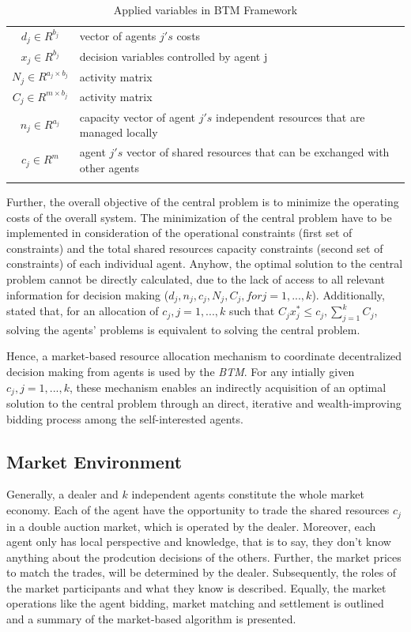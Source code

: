 \begin{longtable}{c|l}
	\hline
    $d_{j} \in R^{b_{j}}$ & vector of agents $j's$ costs \\
    $x_{j} \in R^{b_{j}}$ & decision variables controlled by agent j \\
    $N_{j} \in R^{a_{j} \times b_{j}}$ & activity matrix \\
    $C_{j} \in R^{m \times b_{j}}$ & activity matrix \\
    $n_{j} \in R^{a_{j}}$ & capacity vector of agent $j's$ independent resources that are managed locally \\
    $c_{j} \in R^{m}$ & agent $j's$ vector of shared resources that can be exchanged with other agents \\
	\hline
	\caption{Applied variables in BTM Framework}
	\label{table:applied_variables_in_btm}
\end{longtable} 

Further, the overall objective of the central problem is to minimize the 
operating costs of the overall system. The minimization of the central problem
have to be implemented in consideration of the operational constraints 
(first set of constraints) and the total shared 
resources capacity constraints (second set of constraints) of each individual agent. 
Anyhow, the optimal solution to the central problem cannot be directly calculated, 
due to the lack of access to all relevant information for decision making
($d_{j}, n_{j}, c_{j}, N_{j}, C_{j}, for j=1, ..., k$). 
Additionally,  stated that, for an allocation of 
$c_{j}, j=1, ..., k$ such that $C_{j}x_{j}^{*} \leq c_{j}, \sum\limits_{j=1}^{k} C_{j}$, 
solving the agents’ problems is equivalent to solving the central problem.

Hence, a market-based resource allocation mechanism to coordinate decentralized
decision making from agents is used by the \textit{BTM}. 
For any intially given $c_{j}, j=1, ..., k$, these mechanism enables an indirectly 
acquisition of an optimal solution to the central problem through an direct, iterative and
wealth-improving bidding process among the self-interested agents. 


\subsection{Market Environment}
Generally, a dealer and $k$ independent agents constitute the whole market economy. 
Each of the agent have the opportunity to trade the shared resources $c_{j}$ 
in a double auction market, which is operated by the dealer. Moreover, each agent 
only has local perspective and knowledge, that is to say, they don't know anything about 
the prodcution decisions of the others. 
Further, the market prices to match the trades, will be determined by the dealer.
Subsequently, the roles of the market participants and what they know is described. 
Equally, the market operations like the agent bidding, market matching and settlement 
is outlined and a summary of the market-based algorithm is presented. 

